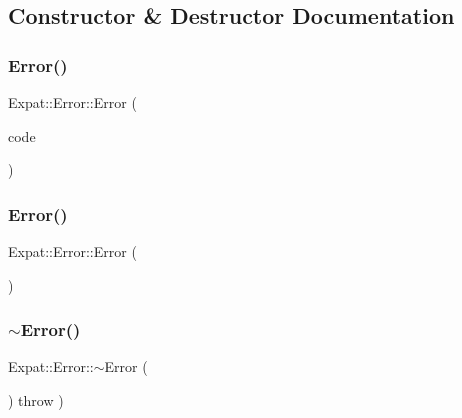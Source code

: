 \subsection{Constructor \& Destructor Documentation}
\hypertarget{class_expat_1_1_error_acd92f134209cff2484b670af3be415ba}{}\label{class_expat_1_1_error_acd92f134209cff2484b670af3be415ba} 
\subsubsection{\texorpdfstring{Error()}{Error()}\hspace{0.1cm}{\footnotesize\ttfamily [1/2]}}
{\footnotesize\ttfamily Expat\+::\+Error\+::\+Error (\begin{DoxyParamCaption}\item[{X\+M\+L\+\_\+\+Error}]{code }\end{DoxyParamCaption})}

\hypertarget{class_expat_1_1_error_a70a379a6a692a1f70929704cd43cb4cf}{}\label{class_expat_1_1_error_a70a379a6a692a1f70929704cd43cb4cf} 
\subsubsection{\texorpdfstring{Error()}{Error()}\hspace{0.1cm}{\footnotesize\ttfamily [2/2]}}
{\footnotesize\ttfamily Expat\+::\+Error\+::\+Error (\begin{DoxyParamCaption}\item[{const \hyperlink{class_expat_1_1_error}{Error} \&}]{ }\end{DoxyParamCaption})\hspace{0.3cm}{\ttfamily [default]}}

\hypertarget{class_expat_1_1_error_a194760fc6775aaadb65df818e7655330}{}\label{class_expat_1_1_error_a194760fc6775aaadb65df818e7655330} 
\subsubsection{\texorpdfstring{$\sim$\+Error()}{~Error()}}
{\footnotesize\ttfamily Expat\+::\+Error\+::$\sim$\+Error (\begin{DoxyParamCaption}{ }\end{DoxyParamCaption}) throw  ) \hspace{0.3cm}{\ttfamily [inline]}}



